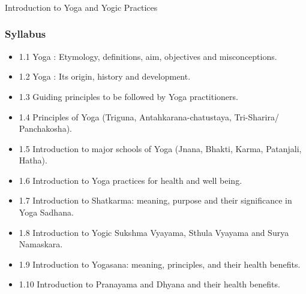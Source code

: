 \begin{frame}[fragile]\frametitle{}
\begin{center}
{\Large Introduction to Yoga and Yogic Practices}
\end{center}
\end{frame}

\begin{frame}[fragile]\frametitle{Syllabus}

\begin{itemize}
\item 1.1  Yoga : Etymology, definitions, aim, objectives and misconceptions. 
\item 1.2  Yoga : Its origin, history and development. 
\item 1.3  Guiding principles to be followed by Yoga practitioners.  
\item 1.4  Principles of Yoga (Triguna, Antahkarana-chatustaya, Tri-Sharira/ Panchakosha). 
\item 1.5  Introduction to major schools of Yoga (Jnana, Bhakti, Karma, Patanjali, Hatha). 
\item 1.6  Introduction to Yoga practices for health and well being. 
\item 1.7  Introduction to Shatkarma: meaning, purpose and their significance in Yoga Sadhana. 
\item 1.8  Introduction to Yogic  Sukshma Vyayama,  Sthula Vyayama and Surya Namaskara.  
\item 1.9  Introduction to Yogasana: meaning, principles, and their health benefits. 
\item 1.10  Introduction to Pranayama and Dhyana and their health benefits. 
\end{itemize}
	  
\end{frame}